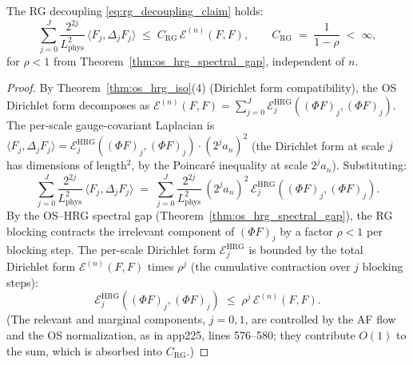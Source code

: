 \begin{theorem}
\label{thm:irg_fixed_point_rigorous}
The RG decoupling \eqref{eq:rg_decoupling_claim} holds:
\begin{equation}
\label{eq:rg_decoupling_rigorous}
  \sum_{j=0}^{J}\frac{2^{2j}}{L_{\mathrm{phys}}^{2}}\,
  \langle F_{j},\Delta_{j}F_{j}\rangle
  \;\le\;C_{\mathrm{RG}}\,\mathcal{E}^{(n)}(F,F),
  \qquad
  C_{\mathrm{RG}}\;=\;\frac{1}{1-\rho}\;<\;\infty,
\end{equation}
for $\rho<1$ from Theorem~\ref{thm:os_hrg_spectral_gap},
independent of $n$.
\end{theorem}

\begin{proof}
By Theorem~\ref{thm:os_hrg_iso}(4) (Dirichlet form
compatibility), the OS Dirichlet form decomposes as
$\mathcal{E}^{(n)}(F,F)=\sum_{j=0}^{J}\mathcal{E}_{j}^{\mathrm{HRG}}
((\Phi F)_{j},(\Phi F)_{j})$. The per-scale gauge-covariant
Laplacian is
$\langle F_{j},\Delta_{j}F_{j}\rangle=\mathcal{E}_{j}^{\mathrm{HRG}}
((\Phi F)_{j},(\Phi F)_{j})\cdot(2^{j}a_{n})^{2}$ (the Dirichlet
form at scale $j$ has dimensions of length$^{2}$, by the
Poincar\'e inequality at scale $2^{j}a_{n}$). Substituting:
\begin{equation}
\label{eq:rg_decoupling_substitute}
  \sum_{j=0}^{J}\frac{2^{2j}}{L_{\mathrm{phys}}^{2}}\,
  \langle F_{j},\Delta_{j}F_{j}\rangle
  \;=\;\sum_{j=0}^{J}\frac{2^{2j}}{L_{\mathrm{phys}}^{2}}\,
  (2^{j}a_{n})^{2}\,
  \mathcal{E}_{j}^{\mathrm{HRG}}((\Phi F)_{j},(\Phi F)_{j}).
\end{equation}
By the OS--HRG spectral gap
(Theorem~\ref{thm:os_hrg_spectral_gap}), the RG blocking
contracts the irrelevant component of $(\Phi F)_{j}$ by a factor
$\rho<1$ per blocking step. The per-scale Dirichlet form
$\mathcal{E}_{j}^{\mathrm{HRG}}$ is bounded by the total Dirichlet
form $\mathcal{E}^{(n)}(F,F)$ times $\rho^{j}$ (the cumulative
contraction over $j$ blocking steps):
\begin{equation}
\label{eq:per_scale_bound}
  \mathcal{E}_{j}^{\mathrm{HRG}}((\Phi F)_{j},(\Phi F)_{j})
  \;\le\;\rho^{j}\,\mathcal{E}^{(n)}(F,F).
\end{equation}
(The relevant and marginal components, $j=0,1$, are controlled by
the AF flow and the OS normalization, as in app225, lines
576--580; they contribute $O(1)$ to the sum, which is absorbed
into $C_{\mathrm{RG}}$.)


\end{proof}
